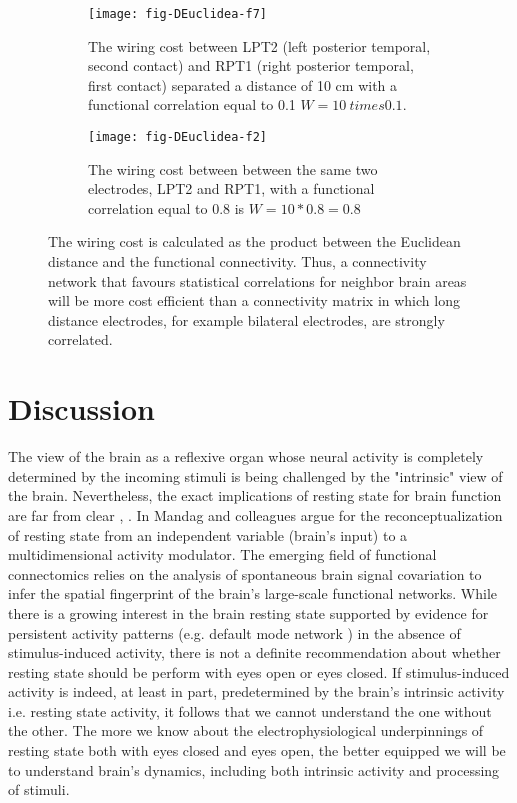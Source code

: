 \documentclass[11pt, onecolumn]{article}
\begin{document}
\begin{figure}[ht] 
  \begin{subfigure}[t]{0.5\linewidth}
    \centering
    \texttt{[image: fig-DEuclidea-f7]} 
    \caption{The wiring cost between LPT2 (left posterior temporal, second contact) and RPT1 (right posterior temporal, first contact) separated a distance of 10 cm with a functional correlation equal to 0.1 $W = 10\ times 0.1$.} 
    \label{fig:kinwaves:a} 
  \end{subfigure} 
  \hspace{1ex}
  \begin{subfigure}[t]{0.5\linewidth}
    \centering
    \texttt{[image: fig-DEuclidea-f2]} 
    \caption{The wiring cost between between the same two electrodes, LPT2 and RPT1,  with a functional correlation equal to 0.8 is $W = 10*0.8= 0.8$} 
    \label{fig:kinwaves:b} 
  \end{subfigure}%
  \caption{The wiring cost is calculated as the product between the Euclidean distance and the functional connectivity. Thus, a connectivity network that favours statistical correlations for neighbor brain areas will be more cost efficient than a connectivity matrix in which long distance electrodes, for example bilateral electrodes, are strongly correlated.}
  \label{fig:kinwaves} 
\end{figure}

\section{Discussion}

The view of the brain as a reflexive organ whose neural activity is completely determined by the incoming stimuli is being challenged by the "intrinsic" view of the brain. Nevertheless, the exact implications of resting state for brain function are far from clear \citep{schneider2008resting}, \citep{northoff2010brain}. 
In \citep{maandag2007energetics} Mandag and colleagues argue for the reconceptualization of resting state from an independent variable (brain’s input) to a multidimensional activity modulator. The emerging field of functional connectomics relies on the analysis of spontaneous brain signal covariation to infer the spatial fingerprint of the brain's large-scale functional networks. While there is a growing interest in the brain resting state supported by evidence for persistent activity patterns (e.g. default mode network \citep{greicius2004default}) in the absence of stimulus-induced activity, there is not a definite recommendation about whether resting state should be perform with eyes open or eyes closed. If stimulus-induced activity is indeed, at least in part, predetermined by the brain’s intrinsic activity i.e. resting state activity, it follows that we cannot understand the one without the other. The more we know about the electrophysiological underpinnings of resting state both with eyes closed and eyes open, the better equipped we will be to understand brain's dynamics, including both intrinsic activity and processing of stimuli. 
\end{document}
